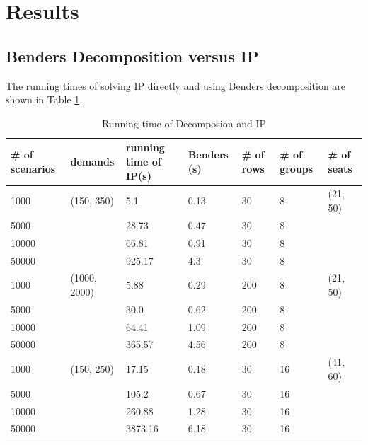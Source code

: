 
\section{Results}





\subsection{Benders Decomposition versus IP}\label{Bender_IP}



The running times of solving IP directly and using Benders decomposition are shown in Table \ref{tab_1}. 

\begin{table}[ht]
  \centering
  \caption{Running time of Decomposion and IP}\label{tab_1}
  \begin{tabular}{|l|l|l|l|l|l|l|}
  \hline
  \# of scenarios & demands & running time of IP(s) & Benders (s) & \# of rows & \# of groups & \# of seats\\
  \hline
  1000  & (150, 350) & 5.1  & 0.13 & 30 & 8 & (21, 50)\\
  5000  & & 28.73 & 0.47 & 30 & 8 \\
  10000 & & 66.81  & 0.91 & 30 & 8 \\
  50000 & & 925.17 & 4.3 & 30 & 8 \\
  \hline
  1000  & (1000, 2000) & 5.88 & 0.29 & 200 & 8 & (21, 50)\\
  5000  & & 30.0 & 0.62 & 200 & 8 \\
  10000 & & 64.41 & 1.09 & 200 & 8 \\
  50000 & & 365.57 & 4.56 & 200 & 8 \\
  \hline
  1000  & (150, 250) & 17.15  & 0.18 & 30 & 16 & (41, 60) \\
  5000  & & 105.2  & 0.67 & 30 & 16  \\
  10000 & & 260.88 & 1.28 & 30 & 16  \\
  50000 & & 3873.16 & 6.18 & 30 & 16  \\
  \hline
  \end{tabular}
\end{table}

